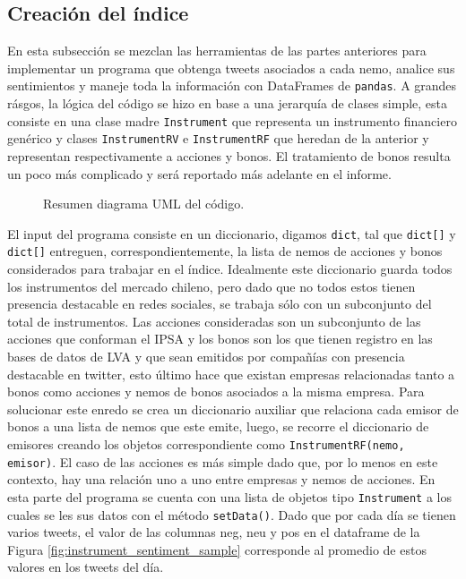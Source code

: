 \documentclass{article}
\begin{document}
\subsection{Creación del índice}
En esta subsección se mezclan las herramientas de las partes anteriores para implementar un programa que obtenga tweets asociados a cada nemo, analice sus sentimientos y maneje toda la información con DataFrames de \texttt{pandas}. A grandes rásgos, la lógica del código se hizo en base a una jerarquía de clases simple, esta consiste en una clase madre \texttt{Instrument} que representa un instrumento financiero genérico y clases \texttt{InstrumentRV} e \texttt{InstrumentRF} que heredan de la anterior y representan respectivamente a acciones y bonos. El tratamiento de bonos resulta un poco más complicado y será reportado más adelante en el informe. 
\begin{figure}[H]
	\centering
	\caption{Resumen diagrama UML del código.}
	\label{fig:uml}
\end{figure}
El input del programa consiste en un diccionario, digamos \texttt{dict}, tal que \texttt{dict[]} y \texttt{dict[]} entreguen, correspondientemente, la lista de nemos de acciones y bonos considerados para trabajar en el índice. Idealmente este diccionario guarda todos los instrumentos del mercado chileno, pero dado que no todos estos tienen presencia destacable en redes sociales, se trabaja sólo con un subconjunto del total de instrumentos. Las acciones consideradas son un subconjunto de las acciones que conforman el IPSA y los bonos son los que tienen registro en las bases de datos de LVA y que sean emitidos por compañías con presencia destacable en twitter, esto último hace que existan empresas relacionadas tanto a bonos como acciones y nemos de bonos asociados a la misma empresa. Para solucionar este enredo se crea un diccionario auxiliar que relaciona cada emisor de bonos a una lista de nemos que este emite, luego, se recorre el diccionario de emisores creando los objetos correspondiente como \texttt{InstrumentRF(nemo, emisor)}. El caso de las acciones es más simple dado que, por lo menos en este contexto, hay una relación uno a uno entre empresas y nemos de acciones. En esta parte del programa se cuenta con una lista de objetos tipo \texttt{Instrument} a los cuales se les  sus datos con el método \texttt{setData()}. Dado que por cada día se tienen varios tweets, el valor de las columnas neg, neu y pos en el dataframe de la Figura \ref{fig:instrument_sentiment_sample} corresponde al promedio de estos valores en los tweets del día.\\
\end{document}

